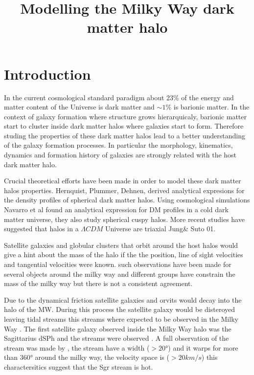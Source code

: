 \documentclass[12pt]{article}
\title{\begin{LARGE}
{Modelling the Milky Way dark matter halo}
\end{LARGE}}
\begin{document}
\maketitle

\section{Introduction}

In the current cosmological standard paradigm about 23\% of the energy and matter
content of the Universe is dark matter and $\sim 1\%$ is barionic matter. In the
context of galaxy formation where structure grows hierarquicaly, barionic matter
start to cluster inside dark matter halos where galaxies start to form. Therefore
studing the properties of these dark matter halos lead to a better understanding
of the galaxy formation processes. In particular the morphology, kinematics, dynamics
and formation history of galaxies are strongly related with the host dark matter halo. 

     
Crucial theoretical efforts have been made in order to model these dark matter halos 
properties. Hernquist, Plummer, Dehnen, derived analytical expresions for the density 
profiles of spherical dark matter halos. Using cosmological simulations Navarro et al 
found an analytical expression for DM profiles in a cold dark matter universe, they also 
study spherical cuspy halos. More recent studies have suggested that halos in a 
$\Lambda CDM$ Universe are triaxial Jung\& Suto 01.   

Satellite galaxies and globular clusters that orbit around the host halos would give 
a hint about the mass of the halo if the the position, line of sight velocities and tangential velocities
were known. such observations have been made for several objects around the milky way and 
different groups have constrain the mass of the milky way but there is not a consistent 
agreement.  

Due to the dynamical friction satellite galaxies and orvits would decay into the halo of the MW. During this 
process the satellite galaxy would be disteroyed leaving tidal streams \citep{toomretoomre72}
this streams where expected to be observed in the Milky Way \citep{lblb95, jhonston96}. 
The first satellite galaxy observed inside the Milky Way halo was the Sagittarius dSPh \citep{ibata94} 
and the streams were observed \citep{ivezic00, yanny00, ibata01b}. A full observation 
of the stream was made by \citep{majewsky03}, the stream  have a width ($>20°$) \citep{belokurov06} and it warps
for more than $360°$\citep{majewsky03, piladiaz13, belokurov14} around the milky way, 
the velocity space is ($>20km/s$) \citep{koposov13} this charactersitics suggest that
the Sgr stream is hot. 
\end{document}
